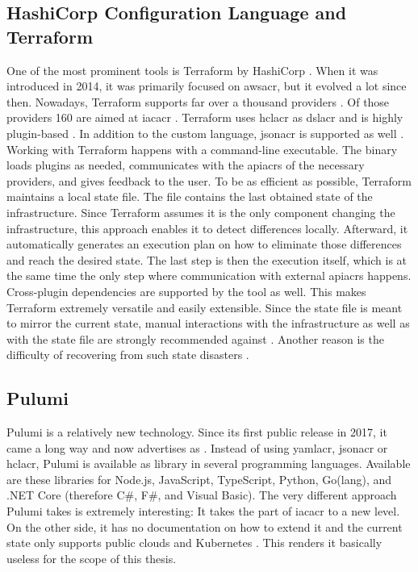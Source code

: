 \subsection{HashiCorp Configuration Language and Terraform}
One of the most prominent tools is Terraform by HashiCorp \cite{googletrends_iac}. When it was introduced in 2014, it was primarily focused on \gls{awsacr}, but it evolved a lot since then. Nowadays, Terraform supports far over a thousand providers \cite{terraform_providers}. Of those providers  160 are aimed at \gls{iacacr} \cite{terraform_providers_infrastructure}. Terraform uses \gls{hclacr} as \gls{dslacr} and is highly plugin-based \cite{terraform} \cite{terraform_docs_extend}. In addition to the custom language, \gls{jsonacr} is supported as well \cite{terraform_syntax}.
\newline
Working with Terraform happens with a command-line executable. The binary loads plugins as needed, communicates with the \gls{apiacr}s of the necessary providers, and gives feedback to the user. To be as efficient as possible, Terraform maintains a local state file. The file contains the last obtained state of the infrastructure. Since Terraform assumes it is the only component changing the infrastructure, this approach enables it to detect differences locally. Afterward, it automatically generates an execution plan on how to eliminate those differences and reach the desired state. The last step is then the execution itself, which is at the same time the only step where communication with external \gls{apiacr}s happens.
\newline
Cross-plugin dependencies are supported by the tool as well. This makes Terraform extremely versatile and easily extensible.
\newline
Since the state file is meant to mirror the current state, manual interactions with the infrastructure as well as with the state file are strongly recommended against \cite{terraform_cli_recover}. Another reason is the difficulty of recovering from such state disasters \cite{terraform_cli_recover}.

\subsection{Pulumi}
Pulumi is a relatively new technology. Since its first public release in 2017, it came a long way and now advertises as  \cite{github_pulumi_first_release} \cite{github_pulumi}. Instead of using \gls{yamlacr}, \gls{jsonacr} or \gls{hclacr}, Pulumi is available as library in several programming languages. Available are these libraries for Node.js, JavaScript, TypeScript, Python, Go(lang), and .NET Core (therefore C\#, F\#, and Visual Basic).
\newline
The very different approach Pulumi takes is extremely interesting: It takes the  part of \gls{iacacr} to a new level. On the other side, it has no documentation on how to extend it and the current state only supports public clouds and Kubernetes \cite{pulumi_providers}. This renders it basically useless for the scope of this thesis.

